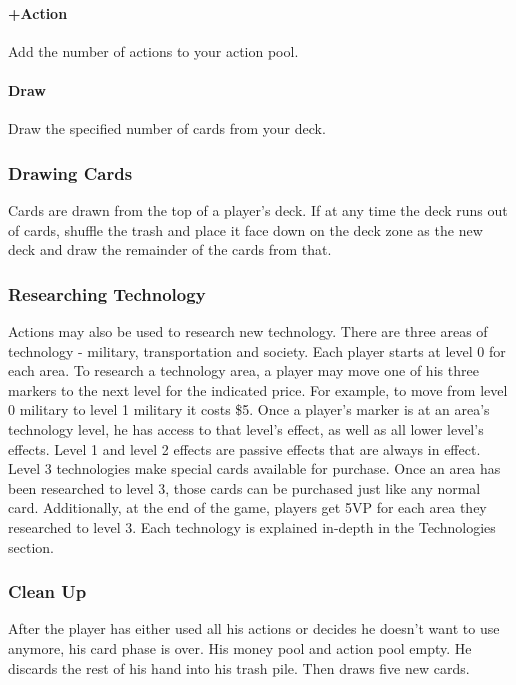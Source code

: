 \documentclass[12pt]{article} %
\begin{document}
\paragraph{+Action}
Add the number of actions to your action pool.

\paragraph{Draw}
Draw the specified number of cards from your deck.

\subsubsection{Drawing Cards}
Cards are drawn from the top of a player's deck.  If at any time the deck runs out of cards, shuffle the trash and place it face down on the deck zone as the new deck and draw the remainder of the cards from that.

\subsubsection{Researching Technology}
Actions may also be used to research new technology.  There are three areas of technology - military, transportation and society.  Each player starts at level 0 for each area.  To research a technology area, a player may move one of his three markers to the next level for the indicated price.  For example, to move from level 0 military to level 1 military it costs \$5.  Once a player's marker is at an area's technology level, he has access to that level's effect, as well as all lower level's effects.  Level 1 and level 2 effects are passive effects that are always in effect.  Level 3 technologies make special cards available for purchase.  Once an area has been researched to level 3, those cards can be purchased just like any normal card.  Additionally, at the end of the game, players get 5VP for each area they researched to level 3.  Each technology is explained in-depth in the Technologies section.

\subsubsection{Clean Up}
After the player has either used all his actions or decides he doesn't want to use anymore, his card phase is over.  His money pool and action pool empty.  He discards the rest of his hand into his trash pile.  Then draws five new cards.
\end{document}
